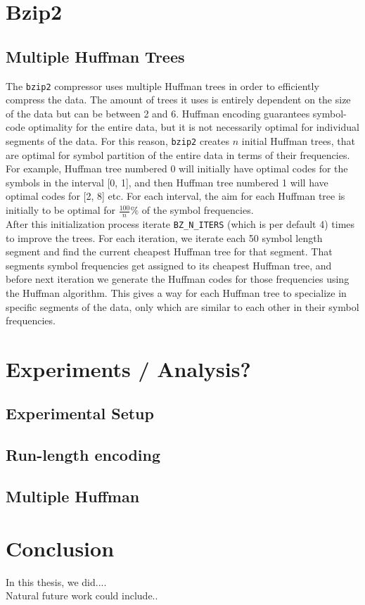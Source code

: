 \documentclass{article}
\begin{document}
\section{Bzip2 }

\subsection{Multiple Huffman Trees}
The \texttt{bzip2} compressor uses multiple Huffman trees in order to efficiently compress the data. The amount of trees it uses is entirely dependent on the size of the data but can be between 2 and 6.
Huffman encoding guarantees symbol-code optimality for the entire data, but it is not necessarily optimal for individual segments of the data. For this reason, \texttt{bzip2} creates \(n\) initial Huffman trees, that are optimal for symbol partition of the entire data in terms of their frequencies. For example, Huffman tree numbered 0 will initially have optimal codes for the symbols in the interval [0, 1], and then Huffman tree numbered 1 will have optimal codes for [2, 8] etc.
For each interval, the aim for each Huffman tree is initially to be optimal for \(\frac{100}{n}\%\) of the symbol frequencies. \\
After this initialization process iterate \texttt{BZ\_N\_ITERS} (which is per default 4) times to improve the trees. For each iteration, we iterate each 50 symbol length segment and find the current cheapest Huffman tree for that segment. That segments symbol frequencies get assigned to its cheapest Huffman tree, and before next iteration we generate the Huffman codes for those frequencies using the Huffman algorithm.
This gives a way for each Huffman tree to specialize in specific segments of the data, only which are similar to each other in their symbol frequencies.

\section{Experiments / Analysis?}
\subsection{Experimental Setup}
\subsection{Run-length encoding}

\subsection{Multiple Huffman}

\section{Conclusion}
In this thesis, we did.... \\
Natural future work could include..


\printbibliography %
\end{document}
